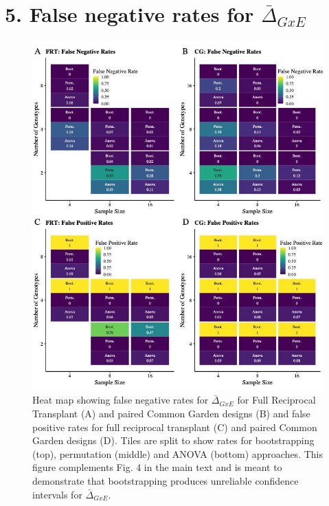 \documentclass[11pt, oneside]{amsart}
\begin{document}
\section{5. False negative rates for $\bar\Delta_{GxE}$}
\renewcommand\thefigure{S5}
\begin{figure}[h]
\begin{center}
\includegraphics[width=6in]{Figs/GxE_Panel.jpg}
\end{center}
\label{Fig: }
\caption[False negative rates for $\bar\Delta_{GxE}$ for Full Reciprocal Transplant (A) and paired Common Garden designs (B) and false positive rates for full reciprocal transplant (C) and paired Common Garden designs (D). ] {Heat map showing false negative rates for $\bar\Delta_{GxE}$ for Full Reciprocal Transplant (A) and paired Common Garden designs (B) and false positive rates for full reciprocal transplant (C) and paired Common Garden designs (D). Tiles are split to show rates for bootstrapping (top), permutation (middle) and ANOVA (bottom) approaches. This figure complements Fig. 4 in the main text and is meant to demonstrate that bootstrapping produces unreliable confidence intervals for  $\bar\Delta_{GxE}$. }

\end{figure}
\end{document}
